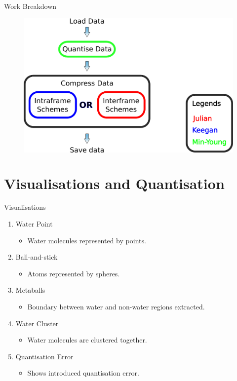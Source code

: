 \documentclass{beamer}
\begin{document}
\begin{frame}{Work Breakdown}
  \begin{figure}
    \includegraphics[width=1.0\textwidth]{legends.png}
  \end{figure}
\end{frame}


\section{Visualisations and Quantisation}

\begin{frame}{Visualisations}
\begin{enumerate}

  \item Water Point
  \begin{itemize}
    \item Water molecules represented by points.
  \end{itemize}

  \item Ball-and-stick
  \begin{itemize}
    \item Atoms represented by spheres.
  \end{itemize}

  \item Metaballs
  \begin{itemize}
    \item Boundary between water and non-water regions extracted.
  \end{itemize}

  \item Water Cluster
  \begin{itemize}
    \item Water molecules are clustered together.
  \end{itemize}

  \item Quantisation Error
  \begin{itemize}
    \item Shows introduced quantisation error.
  \end{itemize}

\end{enumerate}
\end{frame}
\end{document}

